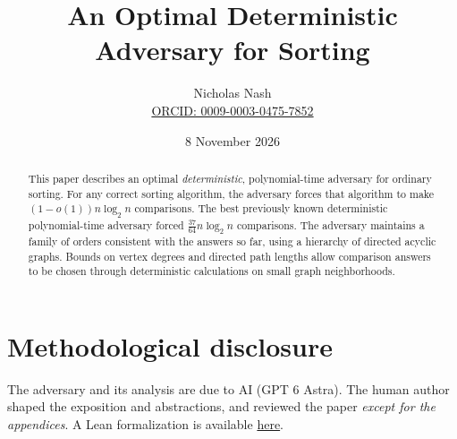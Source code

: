\documentclass[11pt,a4paper]{article}
\title{An Optimal Deterministic Adversary for Sorting}
\author{Nicholas Nash\\[3pt]{\small\href{https://orcid.org/0009-0003-0475-7852}{ORCID: 0009-0003-0475-7852}}}
\date{8 November 2026}
\theoremstyle{definition}
\newcommand{\logtwo}{\log_2}
\begin{document}
\maketitle
\begin{abstract}
This paper describes an optimal \emph{deterministic}, polynomial-time adversary for
ordinary sorting. For any correct sorting algorithm, the adversary forces that
algorithm to make $(1-o(1))n\logtwo n$ comparisons. The best previously known
deterministic polynomial-time adversary forced $\frac{37}{64}n\logtwo n$ comparisons.
The adversary maintains a family of orders consistent with the answers so far,
using a hierarchy of directed acyclic graphs. Bounds on vertex degrees and directed
path lengths allow comparison answers to be chosen through deterministic
calculations on small graph neighborhoods.
\end{abstract}

\section*{Methodological disclosure}
The adversary and its analysis are due to AI (GPT 6 Astra).
The human author shaped the exposition and abstractions, and reviewed
the paper \emph{except for the appendices}.
A Lean formalization is available
\href{https://github.com/nicknash/sorting-adversary-proofs}{here}.








\clearpage
\pagestyle{appendixpages}
\begin{center}
\setlength{\fboxsep}{12pt}
\setlength{\fboxrule}{1pt}
\end{center}
\bigskip
\appendix








\clearpage
\pagestyle{maintext}

\end{document}
